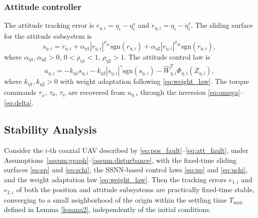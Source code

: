 \subsubsection{Attitude controller}

The attitude tracking error is $r_{\eta,i} = \eta_i - \eta_i^s$ and
$\dot{r}_{\eta,i} = \dot{\eta}_i - \dot{\eta}_i^s$. The sliding surface for
the attitude subsystem is
\begin{equation}
    s_{\eta,i} = \dot{r}_{\eta,i}
    + \alpha_{\eta1} |r_{\eta,i}|^{\rho_{\eta1}} \text{sgn}(r_{\eta,i})
    + \alpha_{\eta2} |r_{\eta,i}|^{\rho_{\eta2}} \text{sgn}(r_{\eta,i}),
    \label{eq:schi}
\end{equation}
where $\alpha_{\eta1}, \alpha_{\eta2} > 0$, $0 < \rho_{\eta1} < 1$,
$\rho_{\eta2} > 1$. The attitude control law is
\begin{equation}
    u_{\eta,i} = -k_{\eta1} s_{\eta,i}
    - k_{\eta2} |s_{\eta,i}|^\gamma \text{sgn}(s_{\eta,i})
    - \hat{W}_{\eta,i}^T \Phi_{\eta,i}(Z_{\eta,i}),
    \label{eq:uchi}
\end{equation}
where $k_{\eta1}, k_{\eta2} > 0$ with weight adaptation following
\eqref{eq:weight_law}. The torque commands $\tau_\varphi$, $\tau_\theta$,
$\tau_\psi$ are recovered from $u_{\eta,i}$ through the inversion
\eqref{eq:omega}--\eqref{eq:delta}.

\subsection{Stability Analysis}
\label{sec5:stability}

\begin{theorem}
\label{thm:stability}
Consider the $i$-th coaxial UAV described by
\eqref{eq:pos_fault}--\eqref{eq:att_fault}, under
Assumptions~\ref{assum:graph}--\ref{assum:disturbance}, with the fixed-time
sliding surfaces \eqref{eq:sp} and \eqref{eq:schi}, the SSNN-based control
laws \eqref{eq:up} and \eqref{eq:uchi}, and the weight adaptation law
\eqref{eq:weight_law}. Then the tracking errors $e_{1,i}$ and $e_{2,i}$ of
both the position and attitude subsystems are practically fixed-time stable,
converging to a small neighborhood of the origin within the settling time
$T_{\max}$ defined in Lemma \eqref{lemma2}, independently of the initial conditions.
\end{theorem}

